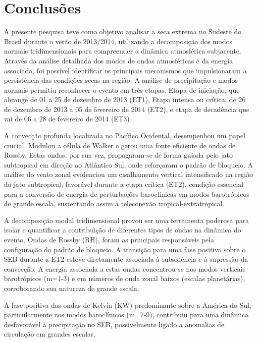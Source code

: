 \chapter{Conclusões}\label{cap:Conclusões}


A presente pesquisa teve como objetivo analisar a seca extrema no Sudeste do Brasil durante o verão de 2013/2014, utilizando a decomposição dos modos normais tridimensionais para compreender a dinâmica atmosférica subjacente. Através da análise detalhada dos modos de ondas atmosféricas e da energia associada, foi possível identificar os principais mecanismos que impulsionaram a persistência das condições secas na região. A análise de precipitação e modos normais permitiu reconhecer o evento em três etapas. Etapa de iniciação, que abrange de 01 a 25 de dezembro de 2013 (ET1), Etapa intensa ou crítica, de 26 de dezembro de 2013 a 05 de fevereiro de 2014 (ET2), e etapa de decadência que vai de 06 a 28 de fevereiro de 2014 (ET3)   

A convecção profunda localizada no Pacífico Ocidental, desempenhou um papel crucial. Modulou a célula de Walker e gerou uma fonte eficiente de ondas de Rossby. Estas ondas, por sua vez, propagaram-se de forma guiada pelo jato subtropical em direção ao Atlântico Sul, onde reforçaram o padrão de bloqueio. A análise do vento zonal evidenciou um cisalhamento vertical intensificado na região do jato subtropical, favorável durante a etapa crítica (ET2), condição essencial para a conversão de energia de perturbações baroclínicas em modos barotrópicos de grande escala, sustentando assim a teleconexão tropical-extratropical.

A decomposição modal tridimensional provou ser uma ferramenta poderosa para isolar e quantificar a contribuição de diferentes tipos de ondas na dinâmica do evento. Ondas de Rossby (RH), foram as principais responsáveis pela configuração do padrão de bloqueio. A transição para uma fase positiva sobre o SEB durante a ET2 esteve diretamente associada à subsidência e à supressão da convecção. A energia associada a estas ondas concentrou-se nos modos verticais barotrópicos (m=1-3) e em números de onda zonal baixos (escalas planetárias), corroborando sua natureza de grande escala. 

A fase positiva das ondas de Kelvin (KW) predominante sobre a América do Sul, particularmente nos modos baroclínicos (m=7-9), contribuiu para uma dinâmica desfavorável à precipitação no SEB, possivelmente ligado a anomalias de circulação em grandes escalas.

